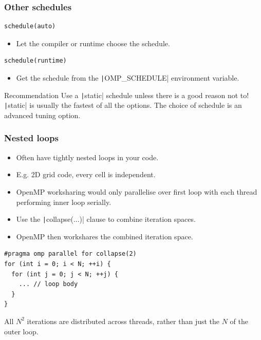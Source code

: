 \documentclass[aspectratio=169]{beamer}
\begin{document}
\begin{frame}[fragile]
\frametitle{Other schedules}
\begin{verbatim}
schedule(auto)
\end{verbatim}
\begin{itemize}
  \item Let the compiler or runtime choose the schedule.
\end{itemize}

\vfill

\begin{verbatim}
schedule(runtime)
\end{verbatim}
\begin{itemize}
  \item Get the schedule from the \texttt|OMP_SCHEDULE| environment variable.
\end{itemize}

\begin{block}{Recommendation}
Use a \texttt|static| schedule unless there is a good reason not to!
\texttt|static| is usually the fastest of all the options.
The choice of schedule is an advanced tuning option.
\end{block}

\end{frame}


\begin{frame}[fragile]
\frametitle{Nested loops}
\begin{itemize}
  \item Often have tightly nested loops in your code.
  \item E.g. 2D grid code, every cell is independent.
  \item OpenMP worksharing would only parallelise over first loop with each thread performing inner loop serially.
  \item Use the \texttt|collapse(...)| clause to combine iteration spaces.
  \item OpenMP then workshares the combined iteration space.
\end{itemize}

\begin{verbatim}
#pragma omp parallel for collapse(2)
for (int i = 0; i < N; ++i) {
  for (int j = 0; j < N; ++j) {
    ... // loop body
  }
}
\end{verbatim}
All $N^2$ iterations are distributed across threads, rather than just the $N$ of the outer loop.

\end{frame}
\end{document}
